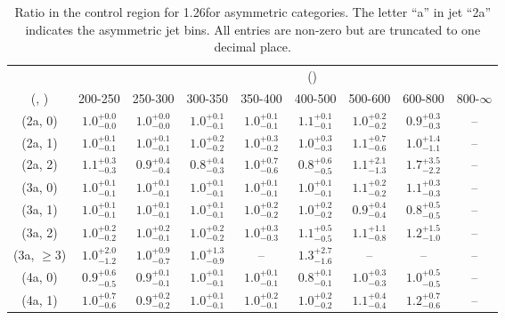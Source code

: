 \begin{table}[h!]
\tiny
\centering
\caption{Ratio in the \mj control region for 1.26\ifb for asymmetric categories. The letter ``a'' in jet \eg ``2a''  indicates the asymmetric jet bins. All entries are non-zero but are truncated to one decimal place.\label{tab:ratiosep_mu_ewk_asym}}
\begin{tabular}
{ccccccccc}
	\hline\hline
&	& \multicolumn{8}{c}{\scalht (\gev)} \\ 
	 (\njet,  \nb) & 200-250 & 250-300 & 300-350 & 350-400 & 400-500 & 500-600 & 600-800 & 800-$\infty$ \\ [0.8ex] 
\hline
	(2a, 0) & $1.0^{+ 0.0 }_{- 0.0 }$ & $1.0^{+ 0.0 }_{- 0.0 }$ & $1.0^{+ 0.1 }_{- 0.1 }$ & $1.0^{+ 0.1 }_{- 0.1 }$ & $1.1^{+ 0.1 }_{- 0.1 }$ & $1.0^{+ 0.2 }_{- 0.2 }$ & $0.9^{+ 0.3 }_{- 0.3 }$ & -- \\[0.5ex] 
	(2a, 1) & $1.0^{+ 0.1 }_{- 0.1 }$ & $1.0^{+ 0.1 }_{- 0.1 }$ & $1.0^{+ 0.2 }_{- 0.2 }$ & $1.0^{+ 0.3 }_{- 0.2 }$ & $1.0^{+ 0.3 }_{- 0.3 }$ & $1.1^{+ 0.7 }_{- 0.6 }$ & $1.0^{+ 1.4 }_{- 1.1 }$ & -- \\[0.5ex] 
	(2a, 2) & $1.1^{+ 0.3 }_{- 0.3 }$ & $0.9^{+ 0.4 }_{- 0.4 }$ & $0.8^{+ 0.4 }_{- 0.3 }$ & $1.0^{+ 0.7 }_{- 0.6 }$ & $0.8^{+ 0.6 }_{- 0.5 }$ & $1.1^{+ 2.1 }_{- 1.3 }$ & $1.7^{+ 3.5 }_{- 2.2 }$ & -- \\[0.5ex] 
	(3a, 0) & $1.0^{+ 0.1 }_{- 0.1 }$ & $1.0^{+ 0.1 }_{- 0.1 }$ & $1.0^{+ 0.1 }_{- 0.1 }$ & $1.0^{+ 0.1 }_{- 0.1 }$ & $1.0^{+ 0.1 }_{- 0.1 }$ & $1.1^{+ 0.2 }_{- 0.2 }$ & $1.1^{+ 0.3 }_{- 0.3 }$ & -- \\[0.5ex] 
	(3a, 1) & $1.0^{+ 0.1 }_{- 0.1 }$ & $1.0^{+ 0.1 }_{- 0.1 }$ & $1.0^{+ 0.1 }_{- 0.1 }$ & $1.0^{+ 0.2 }_{- 0.2 }$ & $1.0^{+ 0.2 }_{- 0.2 }$ & $0.9^{+ 0.4 }_{- 0.4 }$ & $0.8^{+ 0.5 }_{- 0.5 }$ & -- \\[0.5ex] 
	(3a, 2) & $1.0^{+ 0.2 }_{- 0.2 }$ & $1.0^{+ 0.2 }_{- 0.1 }$ & $1.0^{+ 0.2 }_{- 0.2 }$ & $1.0^{+ 0.3 }_{- 0.3 }$ & $1.1^{+ 0.5 }_{- 0.5 }$ & $1.1^{+ 1.1 }_{- 0.8 }$ & $1.2^{+ 1.5 }_{- 1.0 }$ & -- \\[0.5ex] 
	(3a, $\ge3$) & $1.0^{+ 2.0 }_{- 1.2 }$ & $1.0^{+ 0.9 }_{- 0.7 }$ & $1.0^{+ 1.3 }_{- 0.9 }$ & -- & $1.3^{+ 2.7 }_{- 1.6 }$ & -- & -- & -- \\[0.5ex] 
	(4a, 0) & $0.9^{+ 0.6 }_{- 0.5 }$ & $0.9^{+ 0.1 }_{- 0.1 }$ & $1.0^{+ 0.1 }_{- 0.1 }$ & $1.0^{+ 0.1 }_{- 0.1 }$ & $0.8^{+ 0.1 }_{- 0.1 }$ & $1.0^{+ 0.3 }_{- 0.3 }$ & $1.0^{+ 0.5 }_{- 0.5 }$ & -- \\[0.5ex] 
	(4a, 1) & $1.0^{+ 0.7 }_{- 0.6 }$ & $0.9^{+ 0.2 }_{- 0.2 }$ & $1.0^{+ 0.1 }_{- 0.1 }$ & $1.0^{+ 0.2 }_{- 0.1 }$ & $1.0^{+ 0.2 }_{- 0.2 }$ & $1.1^{+ 0.4 }_{- 0.4 }$ & $1.2^{+ 0.7 }_{- 0.6 }$ & -- \\[0.5ex] 

\end{tabular}
\end{table}
